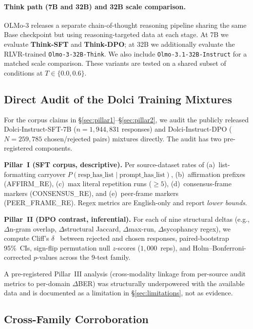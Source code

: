 \documentclass[11pt]{article}
\begin{document}
\paragraph{Think path (7B and 32B) and 32B scale comparison.}
OLMo-3 releases a separate chain-of-thought reasoning pipeline sharing the same Base checkpoint but using reasoning-targeted data at each stage. At 7B we evaluate \textbf{Think-SFT} and \textbf{Think-DPO}; at 32B we additionally evaluate the RLVR-trained \texttt{Olmo-3-32B-Think}. We also include \texttt{Olmo-3.1-32B-Instruct} for a matched scale comparison. These variants are tested on a shared subset of conditions at $T \in \{0.0, 0.6\}$.

\subsection{Direct Audit of the Dolci Training Mixtures}
\label{sec:audit_method}

For the corpus claims in \S\ref{sec:pillar1}--\S\ref{sec:pillar2}, we audit the publicly released Dolci-Instruct-SFT-7B ($n{=}1{,}944{,}831$ responses) and Dolci-Instruct-DPO ($N{=}259{,}785$ chosen/rejected pairs) mixtures directly. The audit has two pre-registered components.

\textbf{Pillar~I (SFT corpus, descriptive).} Per source-dataset rates of (a)~list-formatting carryover $P(\text{resp\_has\_list}\mid\text{prompt\_has\_list})$, (b)~affirmation prefixes (\textsc{AFFIRM\_RE}), (c)~max literal repetition runs ($\geq 5$), (d)~consensus-frame markers (\textsc{CONSENSUS\_RE}), and (e)~peer-frame markers (\textsc{PEER\_FRAME\_RE}). Regex metrics are English-only and report \emph{lower bounds}.

\textbf{Pillar~II (DPO contrast, inferential).} For each of nine structural deltas (e.g., $\Delta$n-gram overlap, $\Delta$structural Jaccard, $\Delta$max-run, $\Delta$sycophancy regex), we compute Cliff's $\delta$~\citep{cliff1993dominance,romano2006} between rejected and chosen responses, paired-bootstrap 95\%~CIs, sign-flip permutation null $z$-scores ($1{,}000$~reps), and Holm--Bonferroni-corrected $p$-values across the 9-test family.

A pre-registered Pillar~III analysis (cross-modality linkage from per-source audit metrics to per-domain $\Delta$BER) was structurally underpowered with the available data and is documented as a limitation in \S\ref{sec:limitations}, not as evidence.

\subsection{Cross-Family Corroboration}
\label{sec:study2_method}
\end{document}
